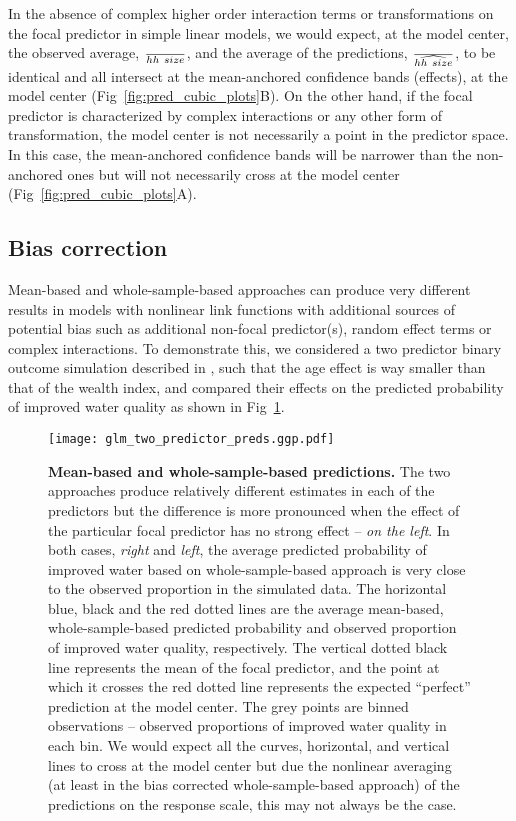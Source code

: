 In the absence of complex higher order interaction terms or transformations on the focal predictor in simple linear models, we would expect, at the model center, the observed average, $\over{hh~size}$, and the average of the predictions, $\over{\widehat{hh~size}}$, to be identical and all intersect at the mean-anchored confidence bands (effects), at the model center (Fig~\ref{fig:pred_cubic_plots}B). On the other hand, if the focal predictor is characterized by complex interactions or any other form of transformation, the model center is not necessarily a point in the predictor space. In this case, the mean-anchored confidence bands will be narrower than the non-anchored ones but will not necessarily cross at the model center (Fig~\ref{fig:pred_cubic_plots}A).

\subsection{Bias correction}

Mean-based and whole-sample-based approaches can produce very different results in models with nonlinear link functions with additional sources of potential bias such as additional non-focal predictor(s), random effect terms or complex interactions. To demonstrate this, we considered a two predictor binary outcome simulation described in , such that the age effect is way smaller than that of the wealth index, and compared their effects on the predicted probability of improved water quality as shown in Fig~\ref{fig:pred_bin_plots}. 

\begin{figure}[h]
\begin{center}
\texttt{[image: glm\_two\_predictor\_preds.ggp.pdf]}
\end{center}
\caption{{\bf Mean-based and whole-sample-based predictions.} The two approaches produce relatively different estimates in each of the predictors but the difference is more pronounced when the effect of the particular focal predictor has no strong effect -- \emph{on the left}. In both cases, \emph{right} and \emph{left}, the average predicted probability of improved water based on whole-sample-based approach is very close to the observed proportion in the simulated data. The horizontal blue, black and the red dotted lines are the average mean-based, whole-sample-based predicted probability and observed proportion of improved water quality, respectively. The vertical dotted black line represents the mean of the focal predictor, and the point at which it crosses the red dotted line represents the expected ``perfect'' prediction at the model center. The grey points are binned observations -- observed proportions of improved water quality in each bin. We would expect all the curves, horizontal, and vertical lines to cross at the model center but due the nonlinear averaging (at least in the bias corrected whole-sample-based approach) of the predictions on the response scale, this may not always be the case.} 
\label{fig:pred_bin_plots}
\end{figure}


